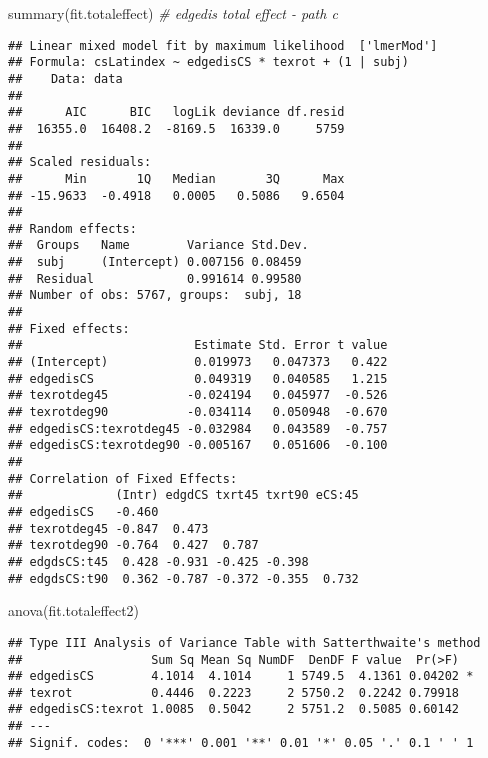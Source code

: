 \documentclass[
]{article}
\newenvironment{Shaded}{\begin{snugshade}}{\end{snugshade}}
\newcommand{\CommentTok}[1]{\textcolor[rgb]{0.56,0.35,0.01}{\textit{#1}}}
\newcommand{\FunctionTok}[1]{\textcolor[rgb]{0.00,0.00,0.00}{#1}}
\newcommand{\NormalTok}[1]{#1}
\begin{document}
\begin{Shaded}
\begin{Highlighting}[]
\FunctionTok{summary}\NormalTok{(fit.totaleffect) }\CommentTok{\# edgedis total effect {-} path c}
\end{Highlighting}
\end{Shaded}

\begin{verbatim}
## Linear mixed model fit by maximum likelihood  ['lmerMod']
## Formula: csLatindex ~ edgedisCS * texrot + (1 | subj)
##    Data: data
## 
##      AIC      BIC   logLik deviance df.resid 
##  16355.0  16408.2  -8169.5  16339.0     5759 
## 
## Scaled residuals: 
##      Min       1Q   Median       3Q      Max 
## -15.9633  -0.4918   0.0005   0.5086   9.6504 
## 
## Random effects:
##  Groups   Name        Variance Std.Dev.
##  subj     (Intercept) 0.007156 0.08459 
##  Residual             0.991614 0.99580 
## Number of obs: 5767, groups:  subj, 18
## 
## Fixed effects:
##                        Estimate Std. Error t value
## (Intercept)            0.019973   0.047373   0.422
## edgedisCS              0.049319   0.040585   1.215
## texrotdeg45           -0.024194   0.045977  -0.526
## texrotdeg90           -0.034114   0.050948  -0.670
## edgedisCS:texrotdeg45 -0.032984   0.043589  -0.757
## edgedisCS:texrotdeg90 -0.005167   0.051606  -0.100
## 
## Correlation of Fixed Effects:
##             (Intr) edgdCS txrt45 txrt90 eCS:45
## edgedisCS   -0.460                            
## texrotdeg45 -0.847  0.473                     
## texrotdeg90 -0.764  0.427  0.787              
## edgdsCS:t45  0.428 -0.931 -0.425 -0.398       
## edgdsCS:t90  0.362 -0.787 -0.372 -0.355  0.732
\end{verbatim}

\begin{Shaded}
\begin{Highlighting}[]
\FunctionTok{anova}\NormalTok{(fit.totaleffect2)}
\end{Highlighting}
\end{Shaded}

\begin{verbatim}
## Type III Analysis of Variance Table with Satterthwaite's method
##                  Sum Sq Mean Sq NumDF  DenDF F value  Pr(>F)  
## edgedisCS        4.1014  4.1014     1 5749.5  4.1361 0.04202 *
## texrot           0.4446  0.2223     2 5750.2  0.2242 0.79918  
## edgedisCS:texrot 1.0085  0.5042     2 5751.2  0.5085 0.60142  
## ---
## Signif. codes:  0 '***' 0.001 '**' 0.01 '*' 0.05 '.' 0.1 ' ' 1
\end{verbatim}
\end{document}
